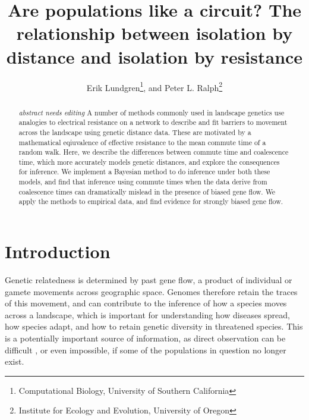 \documentclass{article}
\newcommand{\plr}[1]{{\em \color{blue} #1}}
\begin{document}
\title{Are populations like a circuit? The relationship between isolation by distance and isolation by resistance}
\author{Erik Lundgren\footnote{Computational Biology, University of Southern California}, and
        Peter L. Ralph\footnote{Institute for Ecology and Evolution, University of Oregon}}
\maketitle

\begin{abstract}
\plr{abstract needs editing}
A number of methods commonly used in landscape genetics
use analogies to electrical resistance on a network
to describe and fit barriers to movement across the landscape
using genetic distance data.
These are motivated by a mathematical eqiuvalence of effective resistance
to the mean commute time of a random walk.
Here, we describe the differences between commute time
and coalescence time, which more accurately models genetic distances,
and explore the consequences for inference.
We implement a Bayesian method to do inference under both these models,
and find that inference using commute times
when the data derive from coalescence times
can dramatically mislead in the presence of biased gene flow.
We apply the methods to empirical data,
and find evidence for strongly biased gene flow.
\end{abstract}


\section*{Introduction}

Genetic relatedness is determined by past gene flow,
a product of individual or gamete movements across geographic space.
Genomes therefore retain the traces of this movement,
and can contribute to the inference of how a species moves across a landscape,
which is important for understanding how diseases spread, how species adapt,
and how to retain genetic diversity in threatened species.
This is a potentially important source of information,
as direct observation can be difficult \citep[especially of long-distance movement]{dispersal_estimation},
or even impossible, if some of the populations in question no longer exist.
\end{document}
